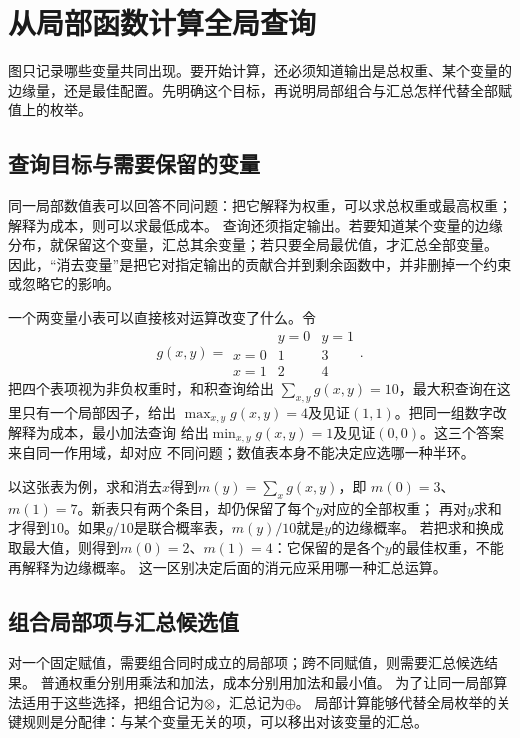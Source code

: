 \section{从局部函数计算全局查询}
\label{sec:graph-theory-semiring-dynamic-programming}

图只记录哪些变量共同出现。要开始计算，还必须知道输出是总权重、某个变量的边缘量，还是最佳配置。先明确这个目标，再说明局部组合与汇总怎样代替全部赋值上的枚举。

\subsection{查询目标与需要保留的变量}

同一局部数值表可以回答不同问题：把它解释为权重，可以求总权重或最高权重；解释为成本，则可以求最低成本。
查询还须指定输出。若要知道某个变量的边缘分布，就保留这个变量，汇总其余变量；若只要全局最优值，才汇总全部变量。
因此，“消去变量”是把它对指定输出的贡献合并到剩余函数中，并非删掉一个约束或忽略它的影响。

一个两变量小表可以直接核对运算改变了什么。令
\[
  g(x,y)=
  \begin{array}{c|cc}
    &y=0&y=1\\ \hline
    x=0&1&3\\
    x=1&2&4
  \end{array}.
\]
把四个表项视为非负权重时，和积查询给出
\(\sum_{x,y}g(x,y)=10\)，最大积查询在这里只有一个局部因子，给出
\(\max_{x,y}g(x,y)=4\)及见证\((1,1)\)。把同一组数字改解释为成本，最小加法查询
给出\(\min_{x,y}g(x,y)=1\)及见证\((0,0)\)。这三个答案来自同一作用域，却对应
不同问题；数值表本身不能决定应选哪一种半环。


以这张表为例，求和消去\(x\)得到\(m(y)=\sum_xg(x,y)\)，即
\(m(0)=3\)、\(m(1)=7\)。新表只有两个条目，却仍保留了每个\(y\)对应的全部权重；
再对\(y\)求和才得到\(10\)。如果\(g/10\)是联合概率表，\(m(y)/10\)就是\(y\)的边缘概率。
若把求和换成取最大值，则得到\(m(0)=2\)、\(m(1)=4\)：它保留的是各个\(y\)的最佳权重，不能再解释为边缘概率。
这一区别决定后面的消元应采用哪一种汇总运算。

\subsection{组合局部项与汇总候选值}

对一个固定赋值，需要组合同时成立的局部项；跨不同赋值，则需要汇总候选结果。
普通权重分别用乘法和加法，成本分别用加法和最小值。
为了让同一局部算法适用于这些选择，把组合记为\(\otimes\)，汇总记为\(\oplus\)。
局部计算能够代替全局枚举的关键规则是分配律：与某个变量无关的项，可以移出对该变量的汇总。

